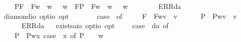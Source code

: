 \begin{isabellebody}
\ \ \ \ {\isacharparenleft}P{\isacharparenleft}{\isasymalpha}{\isacharparenright}{\isacharcomma}F{\isacharparenleft}{\isasymbeta}{\isacharparenright}{\isacharparenright}\ {\isasymRightarrow}\ F{\isacharparenleft}{\isasymlambda}w{\isachardot}\ {\isasymalpha}\ w\ {\isasymlongleftrightarrow}\ {\isasymbeta}\ w{\isacharparenright}\ {\isacharbar}\ {\isacharparenleft}F{\isacharparenleft}{\isasymalpha}{\isacharparenright}{\isacharcomma}P{\isacharparenleft}{\isasymbeta}{\isacharparenright}{\isacharparenright}\ {\isasymRightarrow}\ F{\isacharparenleft}{\isasymlambda}w{\isachardot}\ {\isasymalpha}\ w\ {\isasymlongleftrightarrow}\ {\isasymbeta}\ w{\isacharparenright}\ {\isacharbar}\ \isanewline
\ \ \ \ {\isacharunderscore}\ {\isasymRightarrow}\ ERR{\isacharparenleft}da{\isacharparenright}{\isachardoublequoteclose}\ \ \isanewline
\isanewline
\ \isamarkupfalse%
\ diamond{\isacharcolon}{\isacharcolon}{\isachardoublequoteopen}io\ opt{\isasymRightarrow}io\ opt{\isachardoublequoteclose}\ {\isacharparenleft}{\isachardoublequoteopen}\isactrlbold {\isasymdiamond}\ {\isacharunderscore}{\isachardoublequoteclose}\ {\isacharbrackleft}{}{}{\isacharbrackright}\ {}{}{\isacharparenright}\ \ {\isachardoublequoteopen}\isactrlbold {\isasymdiamond}{\isasymphi}\ {\isasymequiv}\ case\ {\isasymphi}\ of\ \isanewline
\ \ \ \ F{\isacharparenleft}{\isasympsi}{\isacharparenright}\ {\isasymRightarrow}\ F{\isacharparenleft}{\isasymlambda}w{\isachardot}{\isasymexists}v{\isachardot}\ {\isasympsi}\ v{\isacharparenright}\ {\isacharbar}\ \isanewline
\ \ \ \ P{\isacharparenleft}{\isasympsi}{\isacharparenright}\ {\isasymRightarrow}\ P{\isacharparenleft}{\isasymlambda}w{\isachardot}{\isasymexists}v{\isachardot}\ {\isasympsi}\ v{\isacharparenright}\ {\isacharbar}\ \isanewline
\ \ \ \ {\isacharunderscore}\ {\isasymRightarrow}\ ERR{\isacharparenleft}da{\isacharparenright}{\isachardoublequoteclose}\isanewline
\isanewline
\ \isamarkupfalse%
\ exists{\isacharcolon}{\isacharcolon}{\isachardoublequoteopen}{\isacharparenleft}{\isacharprime}a{\isasymRightarrow}io\ opt{\isacharparenright}{\isasymRightarrow}io\ opt{\isachardoublequoteclose}\ {\isacharparenleft}{\isachardoublequoteopen}\isactrlbold {\isasymexists}{\isachardoublequoteclose}{\isacharparenright}\ \ {\isachardoublequoteopen}\isactrlbold {\isasymexists}{\isasymPhi}\ {\isasymequiv}\ case\ {\isacharparenleft}{\isasymPhi}\ da{\isacharparenright}\ of\isanewline
\ \ \ \ P{\isacharparenleft}{\isacharunderscore}{\isacharparenright}\ {\isasymRightarrow}\ P{\isacharparenleft}{\isasymlambda}w{\isachardot}{\isasymexists}x{\isachardot}\ case\ {\isacharparenleft}{\isasymPhi}\ x{\isacharparenright}\ of\ P\ {\isasympsi}\ {\isasymRightarrow}\ {\isasympsi}\ w{\isacharparenright}\ {\isacharbar}\ \isanewline

\end{isabellebody}
